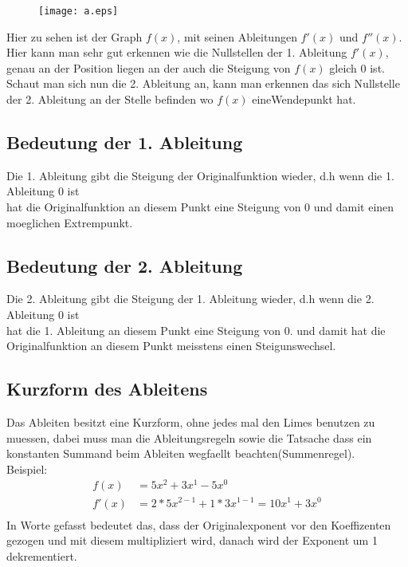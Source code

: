 \documentclass[a4paper]{article} %
\begin{document}
	\begin{minipage}{0.3\textwidth}
	\begin{figure}[H]
	\texttt{[image: a.eps]}
	\caption{}
	\end{figure}
	\end{minipage} \hfill
	\begin{minipage}{0.5\textwidth}
	
	Hier zu sehen ist der Graph $f(x)$, mit seinen Ableitungen $f'(x)$ und $f''(x)$.
	Hier kann man sehr gut erkennen wie die Nullstellen der 1. Ableitung $f'(x)$, genau an
	der Position liegen an der auch die Steigung von $f(x)$ gleich 0 ist.\\
	Schaut man sich nun die 2. Ableitung an, kann man erkennen das sich Nullstelle der 2. Ableitung an der Stelle befinden wo $f(x)$ eineWendepunkt hat.
	
	\end{minipage}


			
		
	\subsection{Bedeutung der 1. Ableitung}
	
	Die 1. Ableitung gibt die Steigung der Originalfunktion wieder, d.h wenn die 1. Ableitung 0 ist \\hat die Originalfunktion an diesem Punkt eine 
	Steigung von 0 und damit einen moeglichen Extrempunkt.
	
	\subsection{Bedeutung der 2. Ableitung}
	Die 2. Ableitung gibt die Steigung der 1. Ableitung wieder, d.h wenn die 2. Ableitung 0 ist \\hat die 1. Ableitung an diesem Punkt eine 
	Steigung von 0. und damit hat die Originalfunktion an diesem Punkt meisstens einen Steigunswechsel.
	\subsection{Kurzform des Ableitens}
	
	Das Ableiten besitzt eine Kurzform, ohne jedes mal den Limes benutzen zu muessen, dabei muss man die Ableitungsregeln sowie die Tatsache dass ein konstanten Summand beim Ableiten wegfaellt beachten(Summenregel).
\\	Beispiel:\\
		\begin{align*}
	f(x)  &= 5x^2+3x^1-5x^0\\
	f'(x)  &= 2*5x^{2-1}+1*3x^{1-1} = 10x^1+3x^0\\
	\end{align*}
	In Worte gefasst bedeutet das, dass der Originalexponent vor den Koeffizenten gezogen und mit diesem multipliziert wird, danach wird der Exponent um 1 dekrementiert.
	
\end{document}
